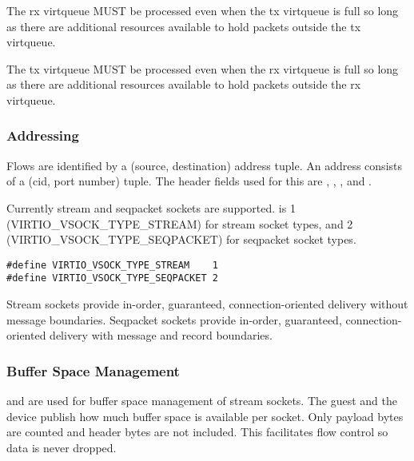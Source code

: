 
The rx virtqueue MUST be processed even when the tx virtqueue is full so long as there are additional resources available to hold packets outside the tx virtqueue.


The tx virtqueue MUST be processed even when the rx virtqueue is full so long as there are additional resources available to hold packets outside the rx virtqueue.

\subsubsection{Addressing}\label{sec:Device Types / Socket Device / Device Operation / Addressing}

Flows are identified by a (source, destination) address tuple.  An address
consists of a (cid, port number) tuple. The header fields used for this are
, , , and .

Currently stream and seqpacket sockets are supported.  is 1 (VIRTIO_VSOCK_TYPE_STREAM)
for stream socket types, and 2 (VIRTIO_VSOCK_TYPE_SEQPACKET) for seqpacket socket types.

\begin{lstlisting}
#define VIRTIO_VSOCK_TYPE_STREAM    1
#define VIRTIO_VSOCK_TYPE_SEQPACKET 2
\end{lstlisting}

Stream sockets provide in-order, guaranteed, connection-oriented delivery
without message boundaries. Seqpacket sockets provide in-order, guaranteed,
connection-oriented delivery with message and record boundaries.

\subsubsection{Buffer Space Management}\label{sec:Device Types / Socket Device / Device Operation / Buffer Space Management}
 and  are used for buffer space management of
stream sockets. The guest and the device publish how much buffer space is
available per socket. Only payload bytes are counted and header bytes are not
included. This facilitates flow control so data is never dropped.

